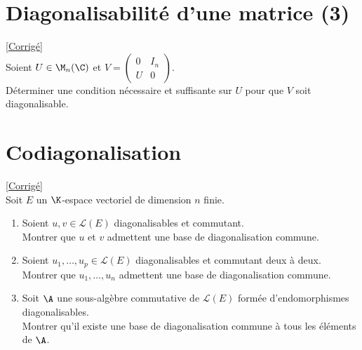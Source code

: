 \documentclass[8pt]{book}
\begin{document}
	\section{Diagonalisabilité d'une matrice (3) }
	\label{Diagonalisabité d'une matrice (3)}
	\textcolor{blue}{\hyperref[Diagonalisabilité d'une matrice (3) corrigé]{[Corrigé]}}\\
	Soient $U\in \M_n(\C)$ et $V=\left( \begin{array}{c|c}
		0&I_n\\
		\hline
		U&0 
	\end{array}\right)$.\\
	Déterminer une condition nécessaire et suffisante sur $U$ pour que $V$ soit diagonalisable.
	
	\section{Codiagonalisation }
	\label{Codiagonalisation}
	\textcolor{blue}{\hyperref[Codiagonalisation corrigé]{[Corrigé]}}\\
	Soit $E$ un $\K$-espace vectoriel de dimension $n$ finie.
	\begin{enumerate}
		\item  Soient $u,v\in \mathcal L(E)$ diagonalisables et commutant. \\Montrer que $u$ et $v$ admettent une base de diagonalisation commune.
		\item Soient $u_1,\dots,u_p\in \mathcal L(E)$ diagonalisables et commutant deux à deux.\\ Montrer que $u_1,\dots,u_n$ admettent une base de diagonalisation commune.
		\item Soit $\A$ une sous-algèbre commutative de $\mathcal L(E)$ formée d'endomorphismes diagonalisables.\\
		Montrer qu'il existe une base de diagonalisation commune à tous les éléments de $\A$.
	\end{enumerate}
\end{document}
